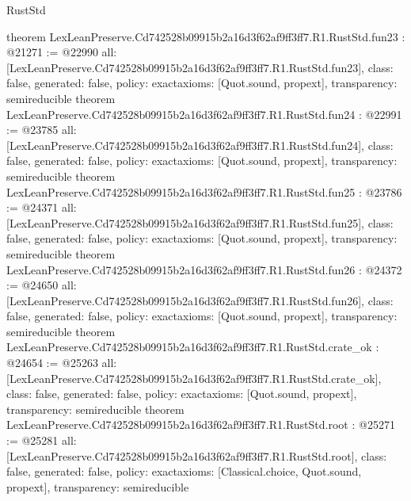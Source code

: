 \begin{lexlean}{RustStd}
\begin{coremodule}
{}
theorem LexLeanPreserve.Cd742528b09915b2a16d3f62af9ff3ff7.R1.RustStd.fun23 : @21271 := @22990 {
  all: [LexLeanPreserve.Cd742528b09915b2a16d3f62af9ff3ff7.R1.RustStd.fun23],
  class: false,
  generated: false,
  policy: exact{axioms: [Quot.sound, propext]},
  transparency: semireducible
}
theorem LexLeanPreserve.Cd742528b09915b2a16d3f62af9ff3ff7.R1.RustStd.fun24 : @22991 := @23785 {
  all: [LexLeanPreserve.Cd742528b09915b2a16d3f62af9ff3ff7.R1.RustStd.fun24],
  class: false,
  generated: false,
  policy: exact{axioms: [Quot.sound, propext]},
  transparency: semireducible
}
theorem LexLeanPreserve.Cd742528b09915b2a16d3f62af9ff3ff7.R1.RustStd.fun25 : @23786 := @24371 {
  all: [LexLeanPreserve.Cd742528b09915b2a16d3f62af9ff3ff7.R1.RustStd.fun25],
  class: false,
  generated: false,
  policy: exact{axioms: [Quot.sound, propext]},
  transparency: semireducible
}
theorem LexLeanPreserve.Cd742528b09915b2a16d3f62af9ff3ff7.R1.RustStd.fun26 : @24372 := @24650 {
  all: [LexLeanPreserve.Cd742528b09915b2a16d3f62af9ff3ff7.R1.RustStd.fun26],
  class: false,
  generated: false,
  policy: exact{axioms: [Quot.sound, propext]},
  transparency: semireducible
}
theorem LexLeanPreserve.Cd742528b09915b2a16d3f62af9ff3ff7.R1.RustStd.crate_ok : @24654 := @25263 {
  all: [LexLeanPreserve.Cd742528b09915b2a16d3f62af9ff3ff7.R1.RustStd.crate_ok],
  class: false,
  generated: false,
  policy: exact{axioms: [Quot.sound, propext]},
  transparency: semireducible
}
theorem LexLeanPreserve.Cd742528b09915b2a16d3f62af9ff3ff7.R1.RustStd.root : @25271 := @25281 {
  all: [LexLeanPreserve.Cd742528b09915b2a16d3f62af9ff3ff7.R1.RustStd.root],
  class: false,
  generated: false,
  policy: exact{axioms: [Classical.choice, Quot.sound, propext]},
  transparency: semireducible
}


\end{coremodule}
\end{lexlean}

